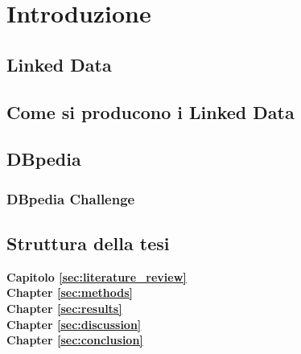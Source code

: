 %
\chapter{Introduzione}
\label{sec:intro}




\section{Linked Data}
\label{sec:intro:linked_data}




\section{Come si producono i Linked Data}
\label{sec:intro:linked_data_production}



\section{DBpedia}
\label{sec:intro:dbpedia}



\subsection{DBpedia Challenge}
\label{sec:intro:dbpedia:challenge}

\section{Struttura della tesi}
\label{sec:intro:structure}

\textbf{Capitolo \ref{sec:literature_review}} \\[0.2em]


\textbf{Chapter \ref{sec:methods}} \\[0.2em]


\textbf{Chapter \ref{sec:results}} \\[0.2em]


\textbf{Chapter \ref{sec:discussion}} \\[0.2em]


\textbf{Chapter \ref{sec:conclusion}} \\[0.2em]

